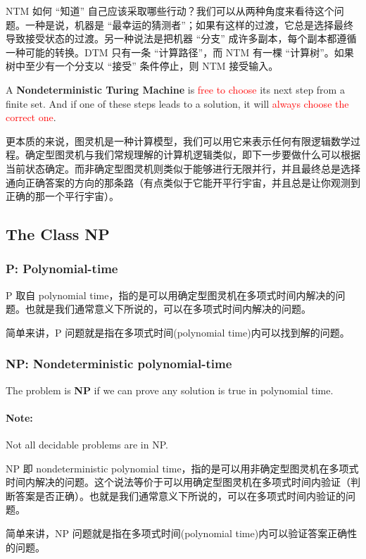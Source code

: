 \documentclass{article}
\begin{document}
NTM 如何 “知道” 自己应该采取哪些行动？我们可以从两种角度来看待这个问题。一种是说，机器是 “最幸运的猜测者”；如果有这样的过渡，它总是选择最终导致接受状态的过渡。另一种说法是把机器 “分支” 成许多副本，每个副本都遵循一种可能的转换。DTM 只有一条 “计算路径”，而 NTM 有一棵 “计算树”。如果树中至少有一个分支以 “接受” 条件停止，则 NTM 接受输入。\par
\hspace*{\fill}\par
A \textbf{Nondeterministic Turing Machine} is \textcolor{red}{free to choose} its next step from a finite set. And if one of these steps leads to a solution, it will \textcolor{red}{always choose the correct one}.\par
\hspace*{\fill}\par
更本质的来说，图灵机是一种计算模型，我们可以用它来表示任何有限逻辑数学过程。确定型图灵机与我们常规理解的计算机逻辑类似，即下一步要做什么可以根据当前状态确定。而非确定型图灵机则类似于能够进行无限并行，并且最终总是选择通向正确答案的方向的那条路（有点类似于它能开平行宇宙，并且总是让你观测到正确的那一个平行宇宙）。

\subsection{The Class NP}
\subsubsection{P: Polynomial-time}
P 取自 polynomial time，指的是可以用确定型图灵机在多项式时间内解决的问题。也就是我们通常意义下所说的，可以在多项式时间内解决的问题。\par
简单来讲，P 问题就是指在多项式时间(polynomial time)内可以找到解的问题。
\subsubsection{NP: Nondeterministic polynomial-time}
The problem is \textbf{NP} if we can prove any solution is true in polynomial time.
\paragraph{Note:} Not all decidable problems are in NP. \par
\hspace*{\fill}\par
NP 即 nondeterministic polynomial time，指的是可以用非确定型图灵机在多项式时间内解决的问题。这个说法等价于可以用确定型图灵机在多项式时间内验证（判断答案是否正确）。也就是我们通常意义下所说的，可以在多项式时间内验证的问题。\par
简单来讲，NP 问题就是指在多项式时间(polynomial time)内可以验证答案正确性的问题。
\end{document}
